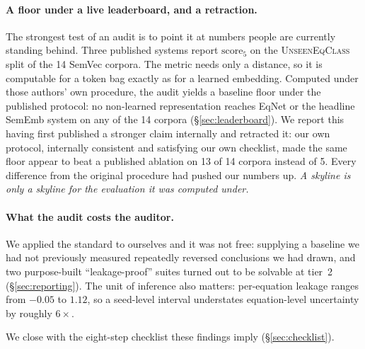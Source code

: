 \paragraph{A floor under a live leaderboard, and a retraction.} The strongest test of an audit is
to point it at numbers people are currently standing behind. Three published systems report
$\mathrm{score}_5$ on the \textsc{UnseenEqClass} split of the 14 SemVec corpora. The metric needs
only a distance, so it is computable for a token bag exactly as for a learned embedding. Computed
under those authors' own procedure, the audit yields a baseline floor under the published protocol: no non-learned
representation reaches EqNet or the headline SemEmb system on any of the 14 corpora
(\S\ref{sec:leaderboard}). We report this having first published a stronger claim internally and
retracted it: our own protocol, internally consistent and satisfying our own checklist, made
the same floor appear to beat a published ablation on 13 of 14 corpora instead of 5. Every
difference from the original procedure had pushed our numbers up. \emph{A skyline is only a
skyline for the evaluation it was computed under.}

\paragraph{What the audit costs the auditor.} We applied the standard to ourselves and it was not
free: supplying a baseline we had not previously measured repeatedly reversed conclusions we had
drawn, and two purpose-built ``leakage-proof'' suites turned out to be solvable at tier~2
(\S\ref{sec:reporting}). The unit of inference also matters: per-equation leakage ranges from
$-0.05$ to $1.12$, so a seed-level interval understates equation-level uncertainty by roughly
$6\times$.

We close with the eight-step checklist these findings imply (\S\ref{sec:checklist}).


